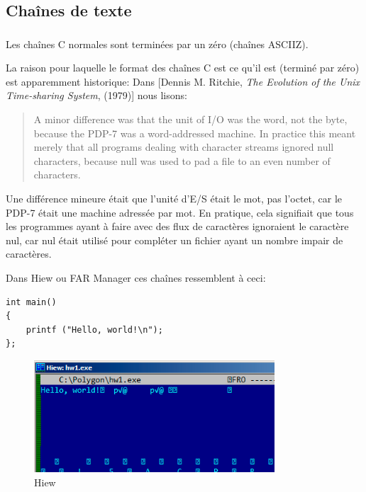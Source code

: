 \subsection{Chaînes de texte}

\subsubsection{\CCpp}

\label{C_strings}
Les chaînes C normales sont terminées par un zéro (chaînes \ac{ASCIIZ}).

La raison pour laquelle le format des chaînes C est ce qu'il est (terminé par zéro)
est apparemment historique:
Dans [Dennis M. Ritchie, \emph{The Evolution of the Unix Time-sharing System}, (1979)]
nous lisons:

\begin{framed}
\begin{quotation}
A minor difference was that the unit of I/O was the word, not the byte, because the PDP-7 was a word-addressed
machine. In practice this meant merely that all programs dealing with character streams ignored null
characters, because null was used to pad a file to an even number of characters.
\end{quotation}
\end{framed}
Une différence mineure était que l'unité d'E/S était le mot, pas l'octet, car le PDP-7 était une machine
adressée par mot. En pratique, cela signifiait que tous les programmes ayant à faire
avec des flux de caractères ignoraient le caractère nul, car nul était utilisé pour compléter un fichier
ayant un nombre impair de caractères.


Dans Hiew ou FAR Manager ces chaînes ressemblent à ceci:

\begin{lstlisting}[style=customc]
int main()
{
	printf ("Hello, world!\n");
};
\end{lstlisting}

\begin{figure}[H]
\centering
\includegraphics[width=0.8\textwidth]{digging_into_code/strings/C-string.png}
\caption{Hiew}
\end{figure}

